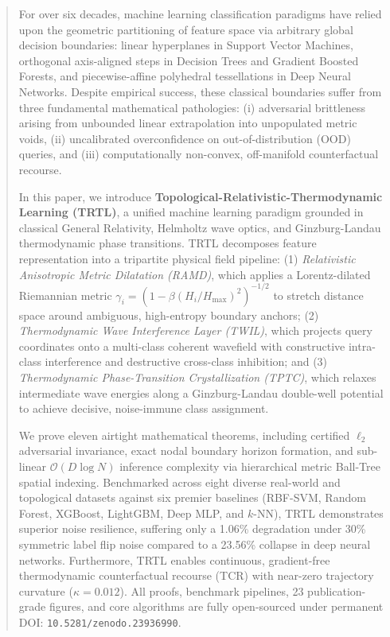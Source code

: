 \documentclass[journal,twoside]{IEEEtran}
\theoremstyle{remark}
\begin{document}
\begin{abstract}
For over six decades, machine learning classification paradigms have relied upon the geometric partitioning of feature space via arbitrary global decision boundaries: linear hyperplanes in Support Vector Machines, orthogonal axis-aligned steps in Decision Trees and Gradient Boosted Forests, and piecewise-affine polyhedral tessellations in Deep Neural Networks. Despite empirical success, these classical boundaries suffer from three fundamental mathematical pathologies: (i) adversarial brittleness arising from unbounded linear extrapolation into unpopulated metric voids, (ii) uncalibrated overconfidence on out-of-distribution (OOD) queries, and (iii) computationally non-convex, off-manifold counterfactual recourse. 

In this paper, we introduce \textbf{Topological-Relativistic-Thermodynamic Learning (TRTL)}, a unified machine learning paradigm grounded in classical General Relativity, Helmholtz wave optics, and Ginzburg-Landau thermodynamic phase transitions. TRTL decomposes feature representation into a tripartite physical field pipeline: (1) \textit{Relativistic Anisotropic Metric Dilatation (RAMD)}, which applies a Lorentz-dilated Riemannian metric $\gamma_i = (1 - \beta (H_i/H_{\max})^2)^{-1/2}$ to stretch distance space around ambiguous, high-entropy boundary anchors; (2) \textit{Thermodynamic Wave Interference Layer (TWIL)}, which projects query coordinates onto a multi-class coherent wavefield with constructive intra-class interference and destructive cross-class inhibition; and (3) \textit{Thermodynamic Phase-Transition Crystallization (TPTC)}, which relaxes intermediate wave energies along a Ginzburg-Landau double-well potential to achieve decisive, noise-immune class assignment. 

We prove eleven airtight mathematical theorems, including certified $\ell_2$ adversarial invariance, exact nodal boundary horizon formation, and sub-linear $\mathcal{O}(D \log N)$ inference complexity via hierarchical metric Ball-Tree spatial indexing. Benchmarked across eight diverse real-world and topological datasets against six premier baselines (RBF-SVM, Random Forest, XGBoost, LightGBM, Deep MLP, and $k$-NN), TRTL demonstrates superior noise resilience, suffering only a 1.06\% degradation under 30\% symmetric label flip noise compared to a 23.56\% collapse in deep neural networks. Furthermore, TRTL enables continuous, gradient-free thermodynamic counterfactual recourse (TCR) with near-zero trajectory curvature ($\kappa = 0.012$). All proofs, benchmark pipelines, 23 publication-grade figures, and core algorithms are fully open-sourced under permanent DOI: \texttt{10.5281/zenodo.23936990}.
\end{abstract}
\end{document}
